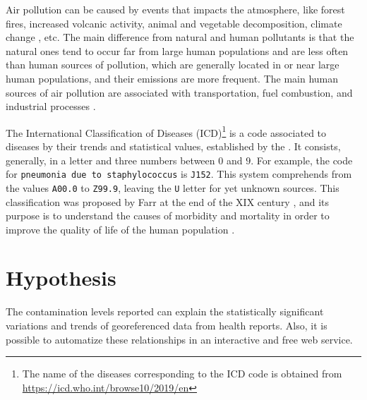 \documentclass[
  11pt,
  a4paper,
  oneside
]{article}
\begin{document}
Air pollution can be caused by events that impacts the atmosphere, like forest fires, increased volcanic activity, animal and vegetable decomposition, climate change \citep{jacobEA2009}, etc. The main difference from natural and human pollutants is that the natural ones tend to occur far from large human populations and are less often than human sources of pollution, which are generally located in or near large human populations, and their emissions are more frequent. The main human sources of air pollution are associated with transportation, fuel combustion, and industrial processes \citep{fenger1999}.

The International Classification of Diseases (ICD)\footnote{The name of the diseases corresponding to the ICD code is obtained from \url{https://icd.who.int/browse10/2019/en}} is a code associated to diseases by their trends and statistical values, established by the \citep{icd}. It consists, generally, in a letter and three numbers between $0$ and $9$. For example, the code for \texttt{pneumonia due to staphylococcus} is \texttt{J152}. This system comprehends from the values \texttt{A00.0} to \texttt{Z99.9}, leaving the \texttt{U} letter for yet unknown sources. This classification was proposed by Farr at the end of the XIX century \cite{who2011}, and its purpose is to understand the causes of morbidity and mortality in order to improve the quality of life of the human population \cite{who2011}.

\section{Hypothesis}
The contamination levels reported can explain the statistically significant variations and trends of georeferenced data from health reports. Also, it is possible to automatize these relationships in an interactive and free web service.
\end{document}

